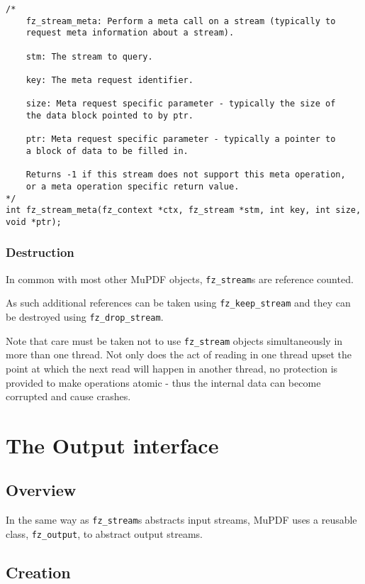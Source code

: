 \documentclass[oneside]{book}
\begin{document}
\begin{lstlisting}
/*
	fz_stream_meta: Perform a meta call on a stream (typically to
	request meta information about a stream).

	stm: The stream to query.

	key: The meta request identifier.

	size: Meta request specific parameter - typically the size of
	the data block pointed to by ptr.

	ptr: Meta request specific parameter - typically a pointer to
	a block of data to be filled in.

	Returns -1 if this stream does not support this meta operation,
	or a meta operation specific return value.
*/
int fz_stream_meta(fz_context *ctx, fz_stream *stm, int key, int size, void *ptr);
\end{lstlisting}

\subsection{Destruction}

In common with most other MuPDF objects, \texttt{fz\_stream}s are reference counted.

As such additional references can be taken using \texttt{fz\_keep\_stream} and they can be destroyed using \texttt{fz\_drop\_stream}.

Note that care must be taken not to use \texttt{fz\_stream} objects  simultaneously in more than one thread. Not only does the act of reading in one thread upset the point at which the next read will happen in another thread, no protection is provided to make operations atomic - thus the internal data can become corrupted and cause crashes.
\chapter{The Output interface}
\label{Output}

\section{Overview}

In the same way as \texttt{fz\_stream}s abstracts input streams, MuPDF uses a reusable class, \texttt{fz\_output}, to abstract output streams.

\section{Creation}
\end{document}
